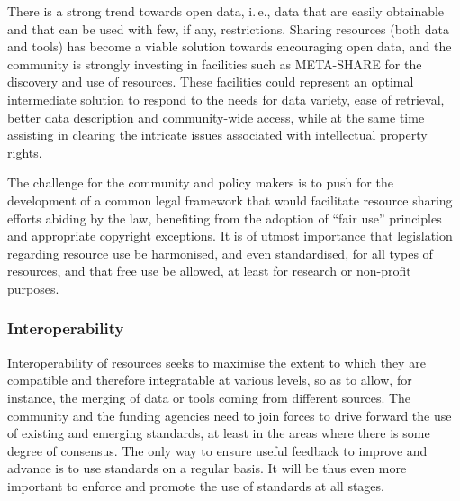\documentclass[10pt, plain]{../../metanetpaper}
\begin{document}
\begin{multicols}{2}
There is a strong trend towards open data, i.\,e., data that are easily obtainable and that can be used with few, if any, restrictions. Sharing resources (both data and tools) has become a viable solution towards encouraging open data, and the community is strongly investing in facilities such as META-SHARE for the discovery and use of resources. These facilities could represent an optimal intermediate solution to respond to the needs for data variety, ease of retrieval, better data description and community-wide access, while at the same time assisting in clearing the intricate issues associated with intellectual property rights.

The challenge for the community and policy makers is to push for the development of a common legal framework that would facilitate resource sharing efforts abiding by the law, benefiting from the adoption of “fair use” principles and appropriate copyright exceptions. It is of utmost importance that legislation regarding resource use be harmonised, and even standardised, for all types of resources, and that free use be allowed, at least for research or non-profit purposes. 



\subsubsection{Interoperability}
\label{sec:interoperability}

Interoperability of resources seeks to maximise the extent to which they are compatible and therefore integratable at various levels, so as to allow, for instance, the merging of data or tools coming from different sources. %
The community and the funding agencies need to join forces to drive forward the use of existing and emerging standards, at least in the areas where there is some degree of consensus. The only way to ensure useful feedback to improve and advance is to use standards on a regular basis. It will be thus even more important to enforce and promote the use of standards at all stages.


\end{multicols}
\end{document}
